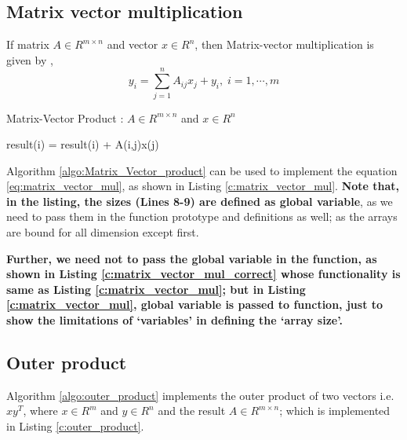 

\subsection{Matrix vector multiplication}
If matrix $A \in {R^{m \times n}}$ and vector $x \in {R^n}$, then Matrix-vector multiplication is given by , 
\begin{equation}
	{y_i} = \sum\limits_{j = 1}^n {{A_{ij}}{x_j} + {y_i}} ,\;i = 1, \cdots ,m
	\label{eq:matrix_vector_mul}
\end{equation}

\begin{algorithm}
	\caption{Matrix-Vector Product : $A \in {R^{m \times n}}$ and $x \in {R^n}$}
	\label{algo:Matrix_Vector_product}
	\begin{algorithmic}[1]
				\State result(i) = result(i) + A(i,j)x(j)
			\EndFor
		\EndFor
	\end{algorithmic}
\end{algorithm}

Algorithm \ref{algo:Matrix_Vector_product} can be used to implement the equation \ref{eq:matrix_vector_mul}, as shown in Listing \ref{c:matrix_vector_mul}. \textbf{Note that, in the listing, the sizes (Lines 8-9) are defined as global variable}, as we need to pass them in the function prototype and definitions as well; as the arrays are bound for all dimension except first. 

\begin{noNumBox}
\textbf{Further, we need not to pass the global variable in the function, as shown in Listing \ref{c:matrix_vector_mul_correct} whose functionality is same as Listing \ref{c:matrix_vector_mul}; but in Listing \ref{c:matrix_vector_mul}, global variable is passed to function, just to show the limitations of `variables' in defining the `array size'.}
\end{noNumBox}





\subsection{Outer product}
 Algorithm \ref{algo:outer_product} implements the outer product of two vectors i.e. $x y^T$, where $x \in {R^m}$ and $y \in {R^n}$ and the result $A \in {R^{m \times n}}$; which is implemented in Listing \ref{c:outer_product}.

